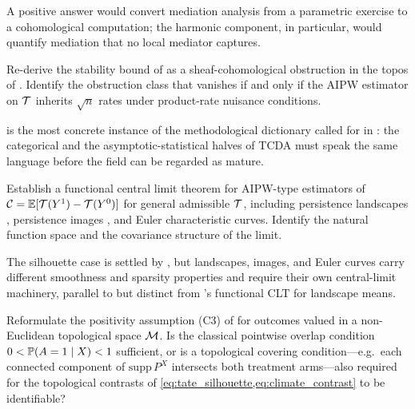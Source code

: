 A positive answer would convert mediation analysis from a parametric
exercise to a cohomological computation; the harmonic component, in
particular, would quantify mediation that no local mediator captures.

\begin{question}
\label{q:sheaf-aipw}
Re-derive the stability bound of \citet[Theorem on silhouette
stability]{kim2026topological} as a sheaf-cohomological obstruction in
the topos of \citet{mahadevan2025sheaf}. Identify the obstruction class
that vanishes if and only if the AIPW estimator on $\mathcal{T}$ inherits
$\sqrt n$ rates under product-rate nuisance conditions.
\end{question}

 is the most concrete instance of the
methodological dictionary called for in : the
categorical and the asymptotic-statistical halves of TCDA must speak
the same language before the field can be regarded as mature.

\begin{question}
\label{q:functional-clt}
Establish a functional central limit theorem for AIPW-type estimators
of $\mathcal{C} = \mathbb{E}[\mathcal{T}(Y^1) - \mathcal{T}(Y^0)]$ for general admissible $\mathcal{T}$,
including persistence landscapes \citep{bubenik2015statistical},
persistence images \citep{adams2017persistence}, and Euler
characteristic curves. Identify the natural function space and the
covariance structure of the limit.
\end{question}

The silhouette case is settled by \citet{kim2026topological}, but
landscapes, images, and Euler curves carry different smoothness and
sparsity properties and require their own central-limit machinery,
parallel to but distinct from \citet{bubenik2015statistical}'s
functional CLT for landscape means.

\begin{question}
\label{q:positivity-noneuclidean}
Reformulate the positivity assumption (C3) of  for
outcomes valued in a non-Euclidean topological space $\mathcal{M}$. Is the
classical pointwise overlap condition
$0 < \mathbb{P}(A = 1 \mid X) < 1$ sufficient, or is a topological
covering condition---e.g.\ each connected component of $\mathrm{supp}\,P^X$
intersects both treatment arms---also required for the topological
contrasts of \cref{eq:tate_silhouette,eq:climate_contrast} to be
identifiable?
\end{question}

